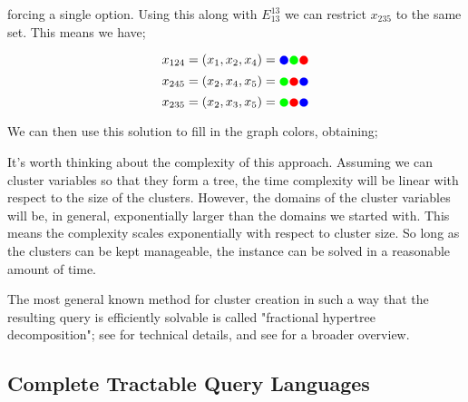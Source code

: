 forcing a single option. Using this along with $E^{13}_{13}$ we can restrict $x_{235}$ to the same set. This means we have;

\begin{equation}
    x_{124} = (x_1, x_2, x_4) = {\color{blue}\CIRCLE} {\color{green}\CIRCLE} {\color{red}\CIRCLE}
\end{equation}
\begin{equation}
    x_{245} = (x_2, x_4, x_5) = {\color{green}\CIRCLE} {\color{red}\CIRCLE} {\color{blue}\CIRCLE}
\end{equation}
\begin{equation}
    x_{235} = (x_2, x_3, x_5) = {\color{green}\CIRCLE} {\color{red}\CIRCLE} {\color{blue}\CIRCLE}
\end{equation}

We can then use this solution to fill in the graph colors, obtaining;

\begin{center}
\end{center}

It's worth thinking about the complexity of this approach. Assuming we can cluster variables so that they form a tree, the time complexity will be linear with respect to the size of the clusters. However, the domains of the cluster variables will be, in general, exponentially larger than the domains we started with. This means the complexity scales exponentially with respect to cluster size. So long as the clusters can be kept manageable, the instance can be solved in a reasonable amount of time.

The most general known method for cluster creation in such a way that the resulting query is efficiently solvable is called "fractional hypertree decomposition"; see \citep{grohe2014constraint} for technical details, and see \citep{marx2013tractable} for a broader overview.

\subsection{Complete Tractable Query Languages}\label{sec:complete-tractable-query-languages}

